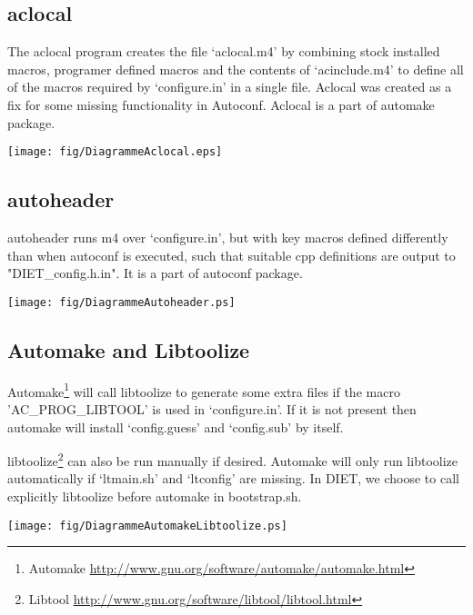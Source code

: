 \subsection{aclocal}
The aclocal program creates the file `aclocal.m4' by combining stock installed
macros, programer defined macros and the contents of `acinclude.m4' to define all
of the macros required by `configure.in' in a single file. Aclocal was 
created as a fix for some missing functionality in Autoconf. Aclocal is a part of
automake package.

\begin{center}
\texttt{[image: fig/DiagrammeAclocal.eps]}
\end{center}

\subsection{autoheader}
autoheader runs m4 over `configure.in', but with key macros defined differently
than when autoconf is executed, such that suitable cpp definitions are output
to "DIET\_config.h.in". It is a part of autoconf package.

\begin{center}
\texttt{[image: fig/DiagrammeAutoheader.ps]}
\end{center}

\subsection{Automake and Libtoolize}
Automake\footnote{Automake {\url{http://www.gnu.org/software/automake/automake.html}}} 
will call libtoolize to generate some extra files if the macro 
'AC\_PROG\_LIBTOOL' is used in `configure.in'. If it is not present 
then automake will install `config.guess' and `config.sub' by itself.

libtoolize\footnote{Libtool {\url{http://www.gnu.org/software/libtool/libtool.html}}}
can also be run manually if desired. 
Automake will only run libtoolize automatically if `ltmain.sh' and `ltconfig' 
are missing. In DIET, we choose to call explicitly libtoolize before automake
in bootstrap.sh.

\begin{center}
\texttt{[image: fig/DiagrammeAutomakeLibtoolize.ps]}
\end{center}

